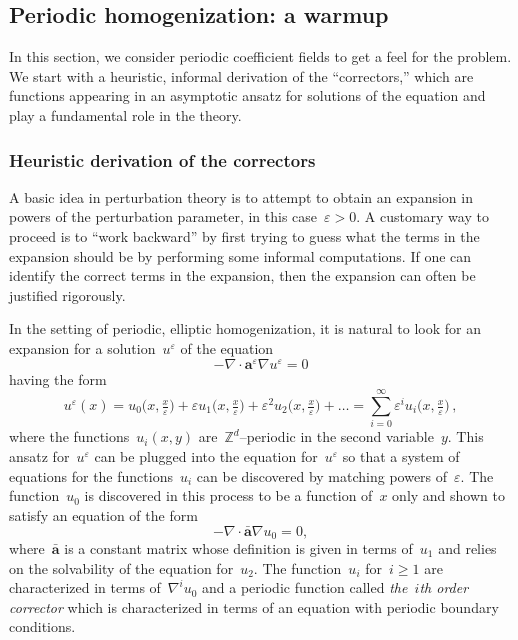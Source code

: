 \documentclass[11pt,twoside]{article} %
\numberwithin{equation}{section}
\theoremstyle{definition}
\newcommand*{\Zd}{\ensuremath{\mathbb{Z}^d}}
\newcommand{\eps}{\varepsilon}
\newcommand{\ep}{\eps}
\renewcommand{\a}{\mathbf{a}}
\newcommand{\ahom}{\bar{\a}}
\begin{document}
\subsection{Periodic homogenization: a warmup}
\label{s.periodic}

In this section, we consider periodic coefficient fields to get a feel for the problem. We start with a heuristic, informal derivation of the ``correctors,'' which are functions appearing in an asymptotic ansatz for solutions of the equation and play a fundamental role in the theory. 


\subsubsection{Heuristic derivation of the correctors}

A basic idea in perturbation theory is to attempt to obtain an expansion in powers of the perturbation parameter, in this case~$\ep>0$. A customary way to proceed is to ``work backward'' by first trying to guess what the terms in the expansion should be by performing some informal computations. If one can identify the correct terms in the expansion, then the expansion can often be justified rigorously. 

\smallskip

In the setting of periodic, elliptic homogenization, it is natural to look for an expansion for a solution~$u^\ep$ of the equation
\begin{equation}
\label{e.pde}
-\nabla \cdot \a^\ep \nabla u^\ep = 0
\end{equation}
having the form 
\begin{equation}
\label{e.ansatz}
u^\ep(x) 
= u_0\bigl(x,\tfrac x\ep\bigr) + \ep u_1\bigl(x,\tfrac x\ep \bigr) + \ep^2 u_2 \bigl(x,\tfrac x\ep \bigr) + \ldots 
= \sum_{i=0}^\infty \ep^i u_i\bigl(x,\tfrac x\ep \bigr)\,,
\end{equation}
where the functions~$u_i(x,y)$ are~$\Zd$--periodic in the second variable~$y$.
This ansatz for~$u^\ep$ can be plugged into the equation for~$u^\ep$ so that a system of equations for the functions~$u_i$ can be discovered by matching powers of~$\ep$. The function~$u_0$ is discovered in this process to be a function of~$x$ only and shown to satisfy an equation of the form
\begin{equation}
-\nabla \cdot \ahom\nabla u_0 = 0,
\end{equation}
where~$\ahom$ is a constant matrix whose definition is given in terms of~$u_1$ and relies on the solvability of the equation for~$u_2$. The function~$u_i$ for~$i\geq 1$ are characterized in terms of~$\nabla^i u_0$ and a periodic function called \emph{the~$i$th order corrector} which is characterized in terms of an equation with periodic boundary conditions. 
\end{document}
